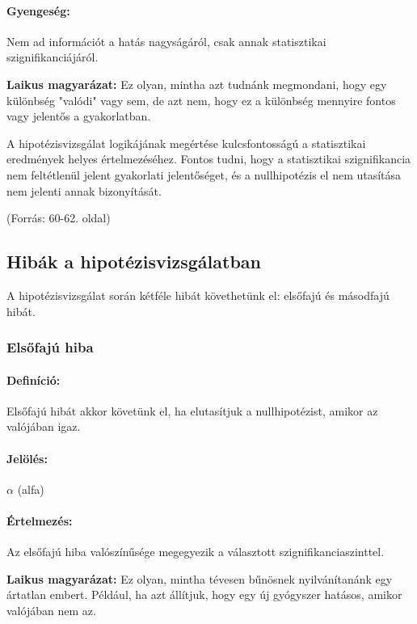 \documentclass[a4paper,12pt]{article}
\begin{document}
    \paragraph{Gyengeség:}
    Nem ad információt a hatás nagyságáról, csak annak statisztikai szignifikanciájáról.

    \textbf{Laikus magyarázat:}
    Ez olyan, mintha azt tudnánk megmondani, hogy egy különbség "valódi" vagy sem, de azt nem, hogy ez a különbség mennyire fontos vagy jelentős a gyakorlatban.

    A hipotézisvizsgálat logikájának megértése kulcsfontosságú a statisztikai eredmények helyes értelmezéséhez. Fontos tudni, hogy a statisztikai szignifikancia nem feltétlenül jelent gyakorlati jelentőséget, és a nullhipotézis el nem utasítása nem jelenti annak bizonyítását.

    (Forrás: 60-62. oldal)

    \subsection{Hibák a hipotézisvizsgálatban}

    A hipotézisvizsgálat során kétféle hibát követhetünk el: elsőfajú és másodfajú hibát.

    \subsubsection{Elsőfajú hiba}

    \paragraph{Definíció:}
    Elsőfajú hibát akkor követünk el, ha elutasítjuk a nullhipotézist, amikor az valójában igaz.

    \paragraph{Jelölés:} $\alpha$ (alfa)

    \paragraph{Értelmezés:}
    Az elsőfajú hiba valószínűsége megegyezik a választott szignifikanciaszinttel.

    \textbf{Laikus magyarázat:}
    Ez olyan, mintha tévesen bűnösnek nyilvánítanánk egy ártatlan embert. Például, ha azt állítjuk, hogy egy új gyógyszer hatásos, amikor valójában nem az.
\end{document}
